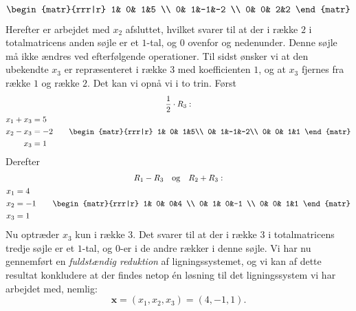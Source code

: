 \begin{example}
\begin{equation}
\begin{gathered}
\begin{matr}{rrr|r}
 1& 0& 1&5 \\
 0& 1&-1&-2 \\
 0& 0& 2&2
\end{matr}
\end{gathered}
\end{equation}
Herefter er arbejdet med $x_2$ afsluttet, hvilket svarer til at der i række $2$ i totalmatricens anden søjle er et $1$-tal, og $0$ ovenfor og nedenunder. Denne søjle må ikke ændres ved efterfølgende operationer.\bs
Til sidst ønsker vi at den ubekendte $x_3$ er repræsenteret i række $3$ med koefficienten $1$, og at $x_3$ fjernes fra række $1$ og række $2$. Det kan vi opnå vi i to trin. Først
\begin{equation} 
\begin{gathered}
\frac 1 2 \cdot R_3: \\
\begin{aligned}
x_1+x_3&=5\\
x_2-x_3&=-2\\
x_3&=1
\end{aligned}
\quad \quad
\begin{matr}{rrr|r}
 1& 0& 1&5\\
 0& 1&-1&-2\\
 0& 0& 1&1
\end{matr}
\end{gathered}
\end{equation}
Derefter
\begin{equation} \label{TN2.7}
\begin{gathered}
R_1 - R_3 \quad \mathrm{og}\quad R_2 + R_3: \\
\begin{aligned}
x_1&=4\\
x_2&=-1 \\
x_3&=1
\end{aligned}
\quad \quad
\begin{matr}{rrr|r}
 1& 0& 0&4 \\
 0&  1& 0&-1 \\
 0& 0&  1&1
\end{matr}
\end{gathered}
\end{equation}
Nu optræder $x_3$ kun i række $3$. Det svarer til at der i række $3$ i totalmatricens tredje søjle er et $1$-tal, og $0$-er i de andre rækker i denne søjle. Vi har nu gennemført en \textit{fuldstændig reduktion} af ligningssystemet, og vi kan af dette resultat konkludere at der findes netop én løsning til det ligningssystem vi har arbejdet med, nemlig:
\begin{equation}\label{TN2.8d}
\mathbf{x}=(x_1,x_2,x_3)=(4,-1,1).
\end{equation}
\end{example}


